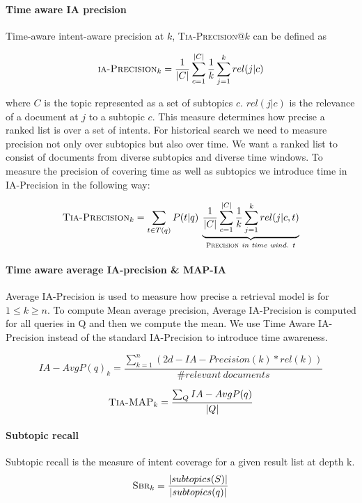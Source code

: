 \paragraph{Time aware IA precision}

Time-aware intent-aware precision at $k$, \textsc{Tia-Precision}$@k$ can be defined as  

\begin{equation}
\textsc{ia-Precision}_k=\frac{1}{|C|}\sum_{c=1}^{|C|}\frac{1}{k}\sum_{j=1}^{k}rel(j|c)
\end{equation}

where $C$ is the topic represented as a set of subtopics $c$. $rel(j|c)$ is the relevance of a document at $j$ to a subtopic $c$. This measure determines how precise a ranked list is over a set of intents. For historical search we need to measure precision not only over subtopics but also over time. We want a ranked list to consist of documents from diverse subtopics and diverse time windows. To measure the precision of covering time as well as subtopics we introduce time in IA-Precision in the following way:

\begin{equation}
\textsc{Tia-Precision}_k= \sum_{t \in T(q)} P(t|q) \: \underbrace{\frac{1}{|C|}\sum_{c=1}^{|C|}\frac{1}{k}\sum_{j=1}^{k}rel(j|c,t)}_{\textsc{Precision}\emph{ in time wind. } t}
\end{equation}

\paragraph{Time aware average IA-precision \& MAP-IA}

Average IA-Precision is used to measure how precise a retrieval model is for $1 \leq k \geq n$. To compute Mean average precision, Average IA-Precision is computed for all queries in Q and then we compute the mean. We use Time Aware IA-Precision instead of the standard IA-Precision to introduce time awareness.

\begin{equation}
IA-AvgP(q)_k = \frac{\sum_{k=1}^{n} (2d-IA-Precision(k) * rel(k))}{\# relevant\:documents} 
\end{equation}

\begin{equation}
  \textsc{Tia-MAP}_k = \frac{\sum_Q IA-AvgP(q)}{|Q|}
\end{equation}


\paragraph{Subtopic recall}
Subtopic recall is the measure of intent coverage for a given result list at depth k. 
\begin{equation}
\textsc{Sbr}_k =\frac{ |subtopics(S)|}{|subtopics(q)|}
\end{equation}

